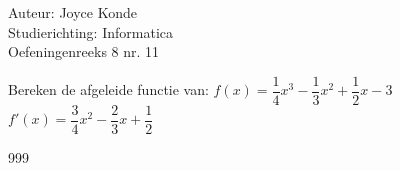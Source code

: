 \documentclass[a4paper]{article}
\begin{document}
  
\noindent \large Auteur: Joyce Konde  \\
\noindent \large Studierichting: Informatica  \\
\noindent \large Oefeningenreeks 8 nr. 11  \\

\medskip

\normalsize

Bereken de afgeleide functie van:   
$f ( x ) = \dfrac{1}{4} x ^ { 3 } - \dfrac{1}{3} x ^ { 2 } + \dfrac{1}{2} x - 3$  \\

$f' ( x ) = \dfrac{3}{4} x ^ { 2 } - \dfrac{2}{3} x + \dfrac{1}{2}$  \\

\begin{thebibliography}{999}
\end{thebibliography}
\end{document}
